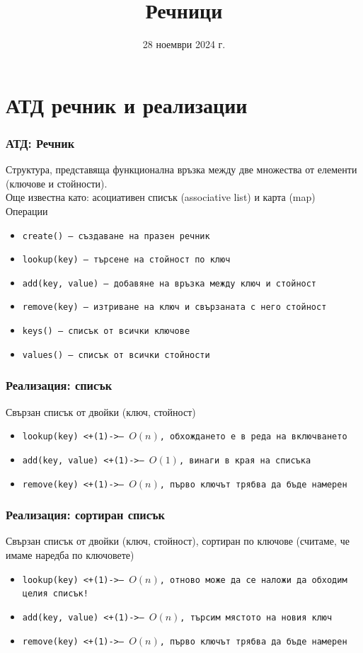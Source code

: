 \documentclass[alsotrans,beameroptions={aspectratio=169}]{beamerswitch}
\title{Речници}
\date{28 ноември 2024 г.}
\begin{document}
\begin{frame}
  \titlepage
\end{frame}

\section{АТД речник и реализации}

\begin{frame}
  \frametitle{АТД: Речник}
  Структура, представяща функционална връзка между две множества от елементи (ключове и стойности).\\[2ex]
  \pause
  Още известна като: асоциативен списък (associative list) и карта (map)\\[2ex]
  \pause
  Операции
  \begin{itemize}
  \item \tt{create()} --- създаване на празен речник
  \item \tt{lookup(key)} --- търсене на стойност по ключ
  \item \tt{add(key, value)} --- добавяне на връзка между ключ и стойност
  \item \tt{remove(key)} --- изтриване на ключ и свързаната с него стойност
  \item \tt{keys()} --- списък от всички ключове
  \item \tt{values()} --- списък от всички стойности
  \end{itemize}
\end{frame}

\begin{frame}
  \frametitle{Реализация: списък}
  Свързан списък от двойки (ключ, стойност)
  \pause
  \begin{itemize}
  \item \tt{lookup(key)} \onslide<+(1)->{--- $O(n)$, обхождането е в реда на включването}
  \item \tt{add(key, value)} \onslide<+(1)->{--- $O(1)$, винаги в края на списъка}
  \item \tt{remove(key)} \onslide<+(1)->{--- $O(n)$, първо ключът трябва да бъде намерен}
  \end{itemize}
\end{frame}

\begin{frame}
  \frametitle{Реализация: сортиран списък}
  Свързан списък от двойки (ключ, стойност), сортиран по ключове (считаме, че имаме наредба по ключовете)
  \pause
  \begin{itemize}
  \item \tt{lookup(key)} \onslide<+(1)->{--- $O(n)$, отново може да се наложи да обходим целия списък!}
  \item \tt{add(key, value)} \onslide<+(1)->{--- \alert{$O(n)$}, търсим мястото на новия ключ}
  \item \tt{remove(key)} \onslide<+(1)->{--- $O(n)$, първо ключът трябва да бъде намерен}
  \end{itemize}
\end{frame}
\end{document}

